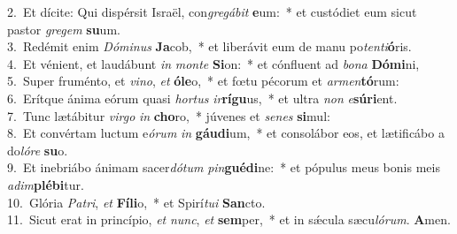 {2.~}Et dícite: Qui dispérsit Israël, con\textit{gre}\textit{gá}\textit{bit} \textbf{e}um:~* et custódiet eum sicut pastor \textit{gre}\textit{gem} \textbf{su}um.\\
{3.~}Redémit enim \textit{Dó}\textit{mi}\textit{nus} \textbf{Ja}cob,~* et liberávit eum de manu po\textit{ten}\textit{ti}\textbf{ó}ris.\\
{4.~}Et vénient, et laudábunt \textit{in} \textit{mon}\textit{te} \textbf{Si}on:~* et cónfluent ad \textit{bo}\textit{na} \textbf{Dó}\textbf{mi}ni,\\
{5.~}Super fruménto, et \textit{vi}\textit{no}, \textit{et} \textbf{ó}\textbf{le}o,~* et fœtu pécorum et \textit{ar}\textit{men}\textbf{tó}rum:\\
{6.~}Erítque ánima eórum quasi \textit{hor}\textit{tus} \textit{ir}\textbf{rí}\textbf{gu}us,~* et ultra \textit{non} \textit{e}\textbf{sú}\textbf{ri}ent.\\
{7.~}Tunc lætábitur \textit{vir}\textit{go} \textit{in} \textbf{cho}ro,~* júvenes et \textit{se}\textit{nes} \textbf{si}mul:\\
{8.~}Et convértam luctum e\textit{ó}\textit{rum} \textit{in} \textbf{gáu}\textbf{di}um,~* et consolábor eos, et lætificábo a do\textit{ló}\textit{re} \textbf{su}o.\\
{9.~}Et inebriábo ánimam sacer\textit{dó}\textit{tum} \textit{pin}\textbf{gué}\textbf{di}ne:~* et pópulus meus bonis meis \textit{a}\textit{dim}\textbf{plé}\textbf{bi}tur.\\
{10.~}Glória \textit{Pa}\textit{tri}, \textit{et} \textbf{Fí}\textbf{li}o,~* et Spirí\textit{tu}\textit{i} \textbf{San}cto.\\
{11.~}Sicut erat in princípio, \textit{et} \textit{nunc}, \textit{et} \textbf{sem}per,~* et in sǽcula sæcu\textit{ló}\textit{rum}. \textbf{A}men.\\
